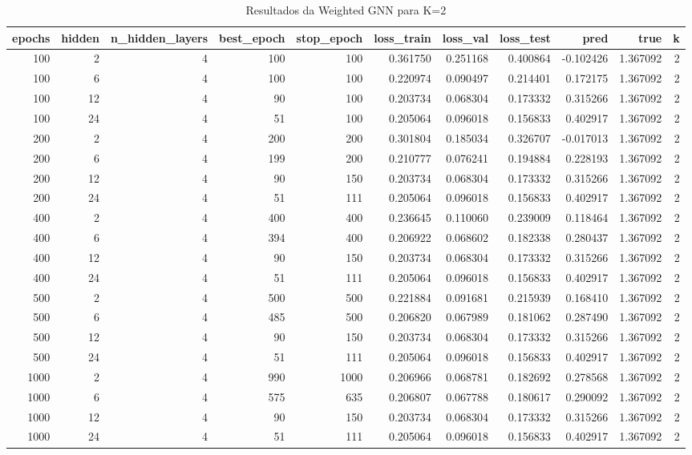 \begin{table}
\caption{Resultados da Weighted GNN para K=2}
\label{tab:weighted_gnn_results_k2}
\begin{tabular}{rrrrrrrrrrr}
\toprule
epochs & hidden & n\_hidden\_layers & best\_epoch & stop\_epoch & loss\_train & loss\_val & loss\_test & pred & true & k \\
\midrule
100 & 2 & 4 & 100 & 100 & 0.361750 & 0.251168 & 0.400864 & -0.102426 & 1.367092 & 2 \\
100 & 6 & 4 & 100 & 100 & 0.220974 & 0.090497 & 0.214401 & 0.172175 & 1.367092 & 2 \\
100 & 12 & 4 & 90 & 100 & 0.203734 & 0.068304 & 0.173332 & 0.315266 & 1.367092 & 2 \\
100 & 24 & 4 & 51 & 100 & 0.205064 & 0.096018 & 0.156833 & 0.402917 & 1.367092 & 2 \\
200 & 2 & 4 & 200 & 200 & 0.301804 & 0.185034 & 0.326707 & -0.017013 & 1.367092 & 2 \\
200 & 6 & 4 & 199 & 200 & 0.210777 & 0.076241 & 0.194884 & 0.228193 & 1.367092 & 2 \\
200 & 12 & 4 & 90 & 150 & 0.203734 & 0.068304 & 0.173332 & 0.315266 & 1.367092 & 2 \\
200 & 24 & 4 & 51 & 111 & 0.205064 & 0.096018 & 0.156833 & 0.402917 & 1.367092 & 2 \\
400 & 2 & 4 & 400 & 400 & 0.236645 & 0.110060 & 0.239009 & 0.118464 & 1.367092 & 2 \\
400 & 6 & 4 & 394 & 400 & 0.206922 & 0.068602 & 0.182338 & 0.280437 & 1.367092 & 2 \\
400 & 12 & 4 & 90 & 150 & 0.203734 & 0.068304 & 0.173332 & 0.315266 & 1.367092 & 2 \\
400 & 24 & 4 & 51 & 111 & 0.205064 & 0.096018 & 0.156833 & 0.402917 & 1.367092 & 2 \\
500 & 2 & 4 & 500 & 500 & 0.221884 & 0.091681 & 0.215939 & 0.168410 & 1.367092 & 2 \\
500 & 6 & 4 & 485 & 500 & 0.206820 & 0.067989 & 0.181062 & 0.287490 & 1.367092 & 2 \\
500 & 12 & 4 & 90 & 150 & 0.203734 & 0.068304 & 0.173332 & 0.315266 & 1.367092 & 2 \\
500 & 24 & 4 & 51 & 111 & 0.205064 & 0.096018 & 0.156833 & 0.402917 & 1.367092 & 2 \\
1000 & 2 & 4 & 990 & 1000 & 0.206966 & 0.068781 & 0.182692 & 0.278568 & 1.367092 & 2 \\
1000 & 6 & 4 & 575 & 635 & 0.206807 & 0.067788 & 0.180617 & 0.290092 & 1.367092 & 2 \\
1000 & 12 & 4 & 90 & 150 & 0.203734 & 0.068304 & 0.173332 & 0.315266 & 1.367092 & 2 \\
1000 & 24 & 4 & 51 & 111 & 0.205064 & 0.096018 & 0.156833 & 0.402917 & 1.367092 & 2 \\
\bottomrule
\end{tabular}
\end{table}

